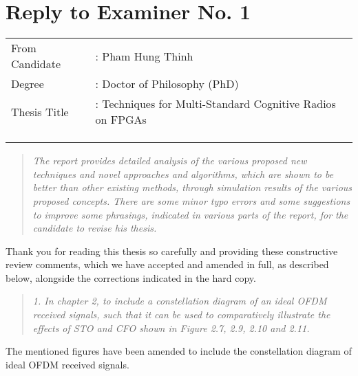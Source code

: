 \documentclass{article}
\begin{document}

\section*{Reply to Examiner No. 1}
\begin{table}[h]
	\begin{tabular}{ll}
{\large From Candidate} &: {\large Pham Hung Thinh} \\
{\large Degree }& : {\large Doctor of Philosophy (PhD)}\\
{\large Thesis Title }&: {\large Techniques for Multi-Standard Cognitive Radios on FPGAs}\\
& \\
& \\
& 
	\end{tabular}
\end{table}


\begin{quote}
\emph{The report provides detailed analysis of the various proposed new techniques and novel approaches and algorithms, which are shown to be better than other existing methods, through simulation results of the various proposed concepts.
There are some minor typo errors and some suggestions to improve some phrasings, indicated in various parts of the report, for the candidate to revise his thesis.}
\end{quote}
Thank you for reading this thesis so carefully and providing these constructive review comments, which we have accepted and amended in full, as described below, alongside the corrections indicated in the hard copy.

\begin{quote}
\emph{1. In chapter 2, to include a constellation diagram of an ideal OFDM received signals, such that it can be used to comparatively illustrate the effects of STO and CFO shown in Figure 2.7, 2.9, 2.10 and 2.11.}
\end{quote}
The mentioned figures have been amended to include the constellation diagram of ideal OFDM received signals.
\end{document}

